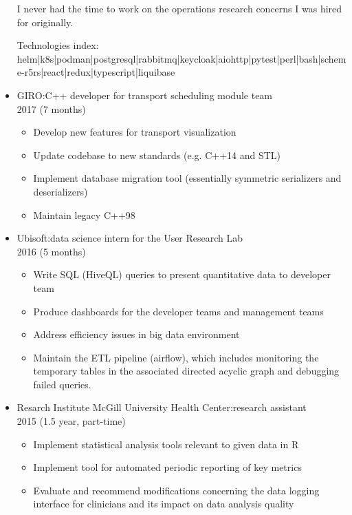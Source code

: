 \documentclass{article}
\begin{document}
\begin{itemize}
                I never had the time to work on the operations research
                concerns I was hired for originally.

                Technologies index:
                helm|k8s|podman|postgresql|rabbitmq|keycloak|aiohttp|pytest|perl|bash|scheme-r5rs|react|redux|typescript|liquibase



  \item GIRO:\@ C++ developer for transport scheduling module team \\ 2017 (7 months)
    \begin{itemize}
      \item Develop new features for transport visualization
      \item Update codebase to new standards (e.g. C++14 and STL)
      \item Implement database migration tool (essentially symmetric serializers and deserializers)
      \item Maintain legacy C++98
    \end{itemize}


  \item Ubisoft:\@ data science intern for the User Research Lab\\ 2016 (5 months)
    \begin{itemize}
      \item Write SQL (HiveQL) queries to present quantitative data to developer team
      \item Produce dashboards for the developer teams and management teams
      \item Address efficiency issues in big data environment
      \item Maintain the ETL pipeline (airflow), which includes monitoring
        the temporary tables in the associated directed acyclic graph and debugging failed queries.
    \end{itemize}

  \item Resarch Institute McGill University Health Center:\@ research assistant\\ 2015 (1.5 year, part-time)
    \begin{itemize}
      \item Implement statistical analysis tools relevant to given data in R
      \item Implement tool for automated periodic reporting of key metrics
      \item Evaluate and recommend modifications concerning the data logging
        interface for clinicians and its impact on data analysis quality
    \end{itemize}


\end{itemize}
\end{document}
